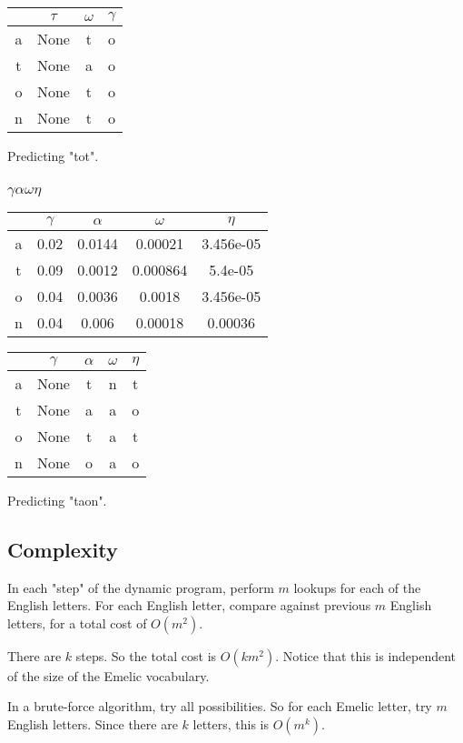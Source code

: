\documentclass[]{article}
\begin{document}
\begin{tabular}{ |c|c|c|c| }
\hline
  & $\tau$ & $\omega$ & $\gamma$ \\
\hline
a & None & t & o \\
t & None & a & o \\
o & None & t & o \\
n & None & t & o \\
\hline
\end{tabular}

Predicting "tot".

\subsubsection{$\gamma \alpha \omega \eta$}

\begin{tabular}{ |c|c|c|c|c| }
\hline
  & $\gamma$ & $\alpha$ & $\omega$ & $\eta$\\
\hline
a & 0.02 & 0.0144 & 0.00021 & 3.456e-05 \\
t & 0.09 & 0.0012 & 0.000864 & 5.4e-05 \\
o & 0.04 & 0.0036 & 0.0018 & 3.456e-05 \\
n & 0.04 & 0.006 & 0.00018 & 0.00036 \\
\hline
\end{tabular}

\begin{tabular}{ |c|c|c|c|c| }
\hline
  & $\gamma$ & $\alpha$ & $\omega$ & $\eta$\\
\hline
a & None & t & n & t \\
t & None & a & a & o \\
o & None & t & a & t \\
n & None & o & a & o \\
\hline
\end{tabular}

Predicting "taon".

\subsection{Complexity}
In each "step" of the dynamic program, perform $m$ lookups for each of the English letters. For each English letter, compare against previous $m$ English letters, for a total cost of $O(m^2)$.

There are $k$ steps. So the total cost is $O(km^2)$. Notice that this is independent of the size of the Emelic vocabulary.

In a brute-force algorithm, try all possibilities. So for each Emelic letter, try $m$ English letters. Since there are $k$ letters, this is $O(m^k)$.
\end{document}
